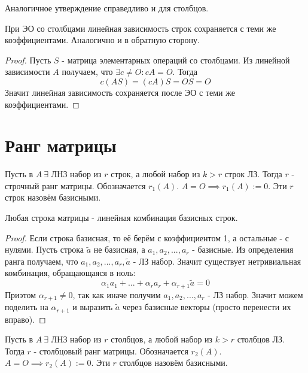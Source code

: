 \documentclass[11pt]{article}
\begin{document}
\begin{remark}
    Аналогичное утверждение справедливо и для столбцов.
\end{remark}

\begin{theorem}
    При ЭО со столбцами линейная зависимость строк сохраняется с теми же 
    коэффициентами. Аналогично и в обратную сторону.
\end{theorem}

\begin{proof}
    Пусть $S$ - матрица элементарных операций со столбцами. Из линейной зависимости 
    $A$ получаем, что $\exists c \neq O: cA = O$. Тогда \[c(AS) = (cA)S = OS = O\] 
    Значит линейная зависимость сохраняется после ЭО с теми же коэффициентами.
\end{proof}

\section{Ранг матрицы}

\begin{definition}
    Пусть в $A \ \exists$ ЛНЗ набор из $r$ строк, а любой набор из $k > r$ строк ЛЗ. 
    Тогда $r$ - строчный ранг матрицы. Обозначается $r_1(A)$. $A = O \implies r_1(A) 
    := 0$. Эти $r$ строк назовём базисными.
\end{definition}

\begin{theorem}
    Любая строка матрицы - линейная комбинация базисных строк. 
\end{theorem}

\begin{proof}
    Если строка базисная, то её берём с коэффициентом 1, а остальные - с нулями. Пусть 
    строка $\widetilde{a}$ не базисная, а $a_1, a_2, ..., a_r$ - базисные. Из определения 
    ранга получаем, что $a_1, a_2, ..., a_r, \widetilde{a}$ - ЛЗ набор. Значит 
    существует нетривиальная комбинация, обращающаяся в ноль: \[\alpha_1a_1 + ... + 
    \alpha_ra_r + \alpha_{r + 1}\widetilde{a} = 0\] Приэтом $\alpha_{r + 1} \neq 0$, так 
    как иначе получим $a_1, a_2, ..., a_r$ - ЛЗ набор. Значит можем поделить на 
    $\alpha_{r + 1}$ и выразить $\widetilde{a}$ через базисные векторы (просто перенести 
    их вправо).
\end{proof}

\begin{definition}
    Пусть в $A \ \exists$ ЛНЗ набор из $r$ столбцов, а любой набор из $k > r$ столбцов 
    ЛЗ. Тогда $r$ - столбцовый ранг матрицы. Обозначается $r_2(A)$. $A = O \implies 
    r_2(A) := 0$. Эти $r$ столбцов назовём базисными.
\end{definition}
\end{document}
